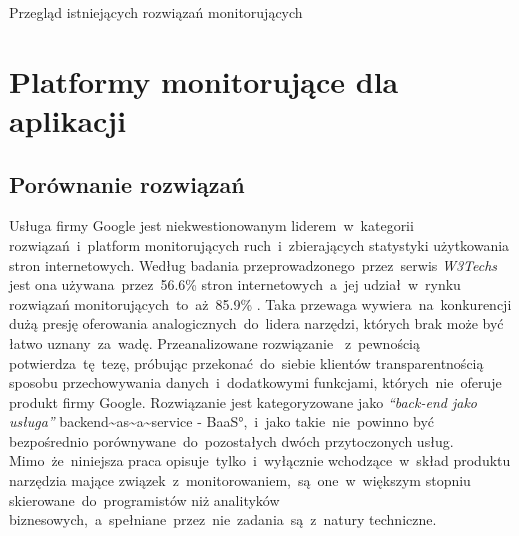 \begin{chapter}{Przegląd istniejących rozwiązań monitorujących}
	\label{cha:existing_solutions}
	\newcommand{\chapterPath}{chapters/Existing_solutions}

	

	\section{Platformy monitorujące dla aplikacji} 
	
	
	
	
	\subsection{Porównanie rozwiązań}
	Usługa firmy Google jest niekwestionowanym liderem~w~kategorii rozwiązań~i~platform monitorujących ruch~i~zbierających statystyki użytkowania stron internetowych. Według badania przeprowadzonego~przez~serwis {\it W3Techs} jest ona używana~przez~56.6\% stron internetowych~a~jej udział~w~rynku rozwiązań monitorujących~to~aż~85.9\% \cite{Analytics_Stats}. Taka przewaga wywiera~na~konkurencji dużą presję oferowania analogicznych~do~lidera narzędzi, których brak może być łatwo uznany~za~wadę. Przeanalizowane rozwiązanie ~z~pewnością potwierdza~tę~tezę, próbując przekonać~do~siebie klientów transparentnością sposobu przechowywania danych~i~dodatkowymi funkcjami, których~nie~oferuje produkt firmy Google. Rozwiązanie  jest kategoryzowane jako {\it ``back-end jako usługa''} \ang{backend~as~a~service - BaaS},~i~jako takie~nie~powinno być bezpośrednio porównywane~do~pozostałych dwóch przytoczonych usług. Mimo~że~niniejsza praca opisuje~tylko~i~wyłącznie wchodzące~w~skład produktu  narzędzia mające związek~z~monitorowaniem,~są~one~w~większym stopniu skierowane~do~programistów niż analityków biznesowych,~a~spełniane~przez~nie~zadania~są~z~natury techniczne.
	
	
	

\end{chapter}
